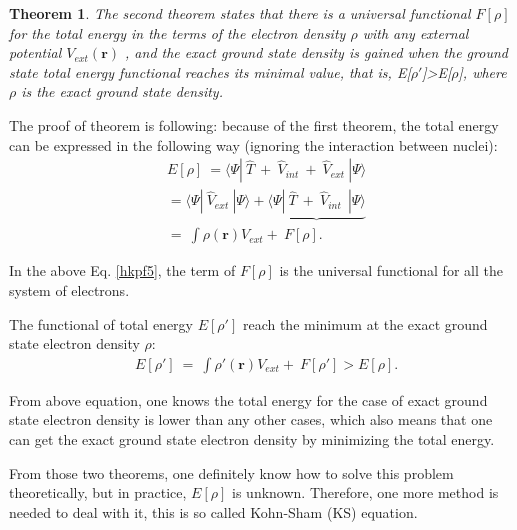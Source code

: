 \documentclass[a4paper, 12pt, titlepage,oneside,drop]{kthesis}
\newtheorem{thm}{Theorem}
\begin{document}
\begin{thm}
\label{hk2}
\noindent The second theorem states that there is a universal functional $F[\rho]$ for the total energy in the terms of the electron density $\rho$ with any external potential $V_\textit{ext}(\textbf{r})$ ,
and the exact ground state density is gained when the ground state total energy functional reaches its minimal value, that is, E[$\rho'$]>E[$\rho$], where $\rho$ is the exact ground state density.
\end{thm}

\noindent The proof of theorem is following:
because of the first theorem, the total energy can be expressed in the following way (ignoring the interaction between nuclei):
\begin{equation}\label{hkpf5}\begin{split}
& E[\rho] \ =\langle \Psi  | \ \hat{T} \ + \ \hat{V}_\textit{int}  \ + \ \hat{V}_\textit{ext} \ | \Psi \rangle \\
&     = \langle \Psi  | \ \hat{V}_\textit{ext} \ | \Psi \rangle  + \underbrace{\langle \Psi  | \ \hat{T} \ + \ \hat{V}_\textit{int}  \ \ | \Psi \rangle}  \\
&     =   \ \int \rho(\textbf{r}) V_\textit{ext}  + \                    F[\rho]. 
\end{split}
\end{equation}

\noindent In the above Eq. \ref{hkpf5}, the term of $F[\rho]$ is the universal functional for all the system of electrons.

\noindent The functional of total energy $E[\rho']$ reach the minimum at the exact ground state electron density $\rho$:
\begin{equation}\begin{split}
 & E[\rho'] \ =   \ \int \rho'(\textbf{r}) V_\textit{ext}  + \  F[\rho'] > E[\rho]. 
\end{split}
\end{equation}
 


\noindent From above equation, one knows the total energy for the case of exact ground state electron density is lower than any other cases, which also means that one can get 
the exact ground state electron density by minimizing the total energy.



\noindent From those two theorems, one definitely know how to solve this problem theoretically, but in practice, $E[\rho]$ is unknown. 
Therefore, one more method is needed to deal with it, this is so called Kohn-Sham (KS) equation.
\end{document}

